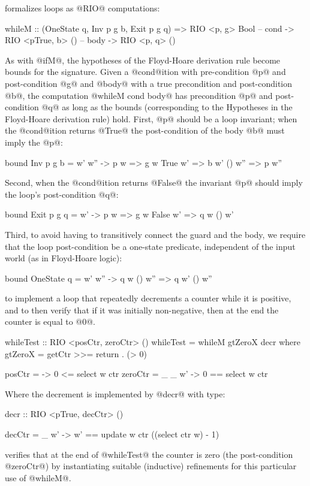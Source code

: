 formalizes loops as @RIO@ computations:
%
\begin{code}
  whileM :: (OneState q, Inv p g b, Exit p g q)  
         => RIO <p, g> Bool      -- cond 
         -> RIO <pTrue, b> ()    -- body
         -> RIO <p, q> ()
\end{code}
%
As with @ifM@, the hypotheses of the Floyd-Hoare derivation rule
become bounds for the signature.
%
Given a @cond@ition with pre-condition @p@ and 
post-condition @g@ and @body@ with a true 
precondition and post-condition @b@, the computation 
@whileM cond body@ has precondition @p@ and post-condition 
@q@ as long as the bounds (corresponding to the Hypotheses
in the Floyd-Hoare derivation rule) hold.
%
First, @p@ should be a loop invariant; \ie when 
the @cond@ition returns @True@ the post-condition 
of the body @b@ must imply the @p@:
%
\begin{code}
  bound Inv p g b = \w w' w'' ->
      p w => g w True w' => b w' () w'' => p w'' 
\end{code}
%
Second, when the @cond@ition returns @False@ the invariant @p@
should imply the loop's post-condition @q@:
%
\begin{code}
  bound Exit p g q = \w w' ->
        p w => g w False w' => q w () w'
\end{code}
%
Third, to avoid having to transitively connect the guard and the body,
we require that the loop post-condition be a one-state predicate,
independent of the input world (as in Floyd-Hoare logic):
%
\begin{code}
  bound OneState q = \w w' w'' ->
        q w () w'' => q w' () w''
\end{code}

 to implement a loop that repeatedly
decrements a counter while it is positive, and to then verify that
if it was initially non-negative, then
at the end the counter is equal to @0@.
%
\begin{code}
  whileTest   :: RIO <posCtr, zeroCtr> ()
  whileTest = whileM gtZeroX decr
    where gtZeroX = getCtr >>= return . (> 0)
  
  posCtr  = \w -> 0 <= select w ctr
  zeroCtr = \_ _ w' -> 0 == select w ctr 
\end{code}
%
Where the decrement is implemented by @decr@ with type:
%
\begin{code}
  decr :: RIO <pTrue, decCtr> ()
  
  decCtr = \w _ w' -> w' == update w ctr ((select ctr w) - 1)
\end{code}
\toolname verifies that at the end of @whileTest@ 
the counter is zero (\ie the post-condition @zeroCtr@)
by instantiating suitable (\ie inductive) refinements
for this particular use of @whileM@.
 